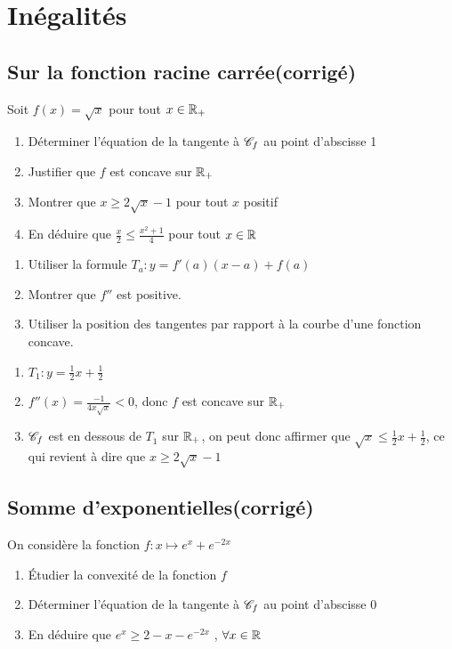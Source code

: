 \documentclass[oneside,12pt]{book}          %
\begin{document}
\section{Inégalités}

\subsection{Sur la fonction racine carrée\quad\small{(corrigé)}}
Soit $f(x)=\sqrt{x}$ pour tout ${x\in\mathbb R}_+$

\begin{enumerate}
	\item Déterminer l'équation de la tangente à ${\mathscr{C}}_f$ au point d'abscisse 1
	\item Justifier que $f$ est concave sur ${\mathbb R}_+$
	\item Montrer que $x\geq2\sqrt{x}-1$ pour tout $x$ positif
    \item[$\dur$] En déduire que $\frac{x}{2}\leq\frac{x^2+1}{4}$ pour tout ${x\in\mathbb R}$
\end{enumerate}

\begin{hint}
	\begin{enumerate}
		\item Utiliser la formule $T_a:y=f'(a)(x-a)+f(a)$
		\item Montrer que $f''$ est positive.
		\item Utiliser la position des tangentes par rapport à la courbe d'une fonction concave.
	\end{enumerate}
\end{hint}
\begin{sol}
	\begin{enumerate}
		\item $T_1:y=\frac{1}{2}x+\frac{1}{2}$
		\item $f''(x)=\frac{-1}{4x\sqrt{x}}<0$, donc $f$ est concave sur ${\mathbb R}_+$
		\item ${\mathscr{C}}_f$ est en dessous de $T_1$ sur ${\mathbb R}_+$, on peut donc affirmer que $\sqrt{x}\leq\frac{1}{2}x+\frac{1}{2}$, ce qui revient à dire que $x\geq2\sqrt{x}-1$
	\end{enumerate}
\end{sol}

 

\subsection{Somme d'exponentielles\quad\small{(corrigé)}}
On considère la fonction $f:x\mapsto e^x+e^{-2x}$
\begin{enumerate}
    \item Étudier la convexité de la fonction $f$
    \item Déterminer l'équation de la tangente à ${\mathscr{C}}_f$ au point d'abscisse 0
    \item En déduire que $e^x\geq2-x-e^{-2x}$ , $\forall {x\in\mathbb R}$
\end{enumerate}
\end{document}
